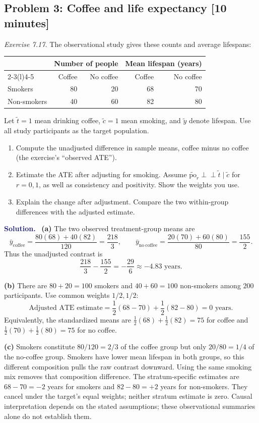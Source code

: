 \documentclass[11pt]{article}
\newcommand{\rv}[1]{\widetilde{#1}}
\newcommand{\po}[1]{\widetilde{\mathrm{po}}_{#1}}
\newcommand{\indep}{\mathrel{\perp\!\!\!\perp}}
\newenvironment{answer}{%
    \par\medskip\noindent\textcolor{MidnightBlue}{\textbf{Solution.}}\ }
    {\par\medskip}
\newcommand{\workingspace}[1]{}
\newcommand{\workingspace}[1]{\vspace{#1}}
\begin{document}
\newpage
\subsection*{Problem 3: Coffee and life expectancy \hfill [10 minutes]}
\noindent\textit{Exercise 7.17.} The observational study gives these counts
and average lifespans:
\begin{center}
\begin{tabular}{@{}lrrrr@{}}
\toprule
& \multicolumn{2}{c}{Number of people}
& \multicolumn{2}{c}{Mean lifespan (years)}\\
\cmidrule(lr){2-3}\cmidrule(l){4-5}
& Coffee & No coffee & Coffee & No coffee\\
\midrule
Smokers     & 80 & 20 & 68 & 70\\
Non-smokers & 40 & 60 & 82 & 80\\
\bottomrule
\end{tabular}
\end{center}
Let $\rv{t}=1$ mean drinking coffee, $\rv{c}=1$ mean smoking, and
$\rv{y}$ denote lifespan. Use all study participants as the target population.
\begin{enumerate}
  \item Compute the unadjusted difference in sample means, coffee minus
    no coffee (the exercise's ``observed ATE'').
  \item Estimate the ATE after adjusting for smoking. Assume
    $\po{r}\indep\rv{t}\mid\rv{c}$ for $r=0,1$, as well as consistency
    and positivity. Show the weights you use.
  \item Explain the change after adjustment. Compare the two within-group
    differences with the adjusted estimate.
\end{enumerate}
\workingspace{6.5cm}

\begin{answer}
\textbf{(a)} The two observed treatment-group means are
\[
  \bar y_{\mathrm{coffee}}=\frac{80(68)+40(82)}{120}
       =\frac{218}{3},
  \qquad
  \bar y_{\mathrm{no\ coffee}}=\frac{20(70)+60(80)}{80}
       =\frac{155}{2}.
\]
Thus the unadjusted contrast is
\[
  \boxed{\frac{218}{3}-\frac{155}{2}
       =-\frac{29}{6}\approx-4.83\text{ years}.}
\]

\textbf{(b)} There are $80+20=100$ smokers and $40+60=100$
non-smokers among $200$ participants. Use common weights $1/2,1/2$:
\[
  \boxed{\text{Adjusted ATE estimate}
    =\frac12(68-70)+\frac12(82-80)=0\text{ years}.}
\]
Equivalently, the standardized means are
$\tfrac12(68)+\tfrac12(82)=75$ for coffee and
$\tfrac12(70)+\tfrac12(80)=75$ for no coffee.

\textbf{(c)} Smokers constitute $80/120=2/3$ of the coffee group but only
$20/80=1/4$ of the no-coffee group. Smokers have lower mean lifespan in both
groups, so this different composition pulls the raw contrast downward.
Using the same smoking mix removes that composition difference.
The stratum-specific estimates are $68-70=-2$ years for smokers and
$82-80=+2$ years for non-smokers. They cancel under the target's equal weights;
neither stratum estimate is zero. Causal interpretation depends on the stated
assumptions; these observational summaries alone do not establish them.
\end{answer}
\end{document}
